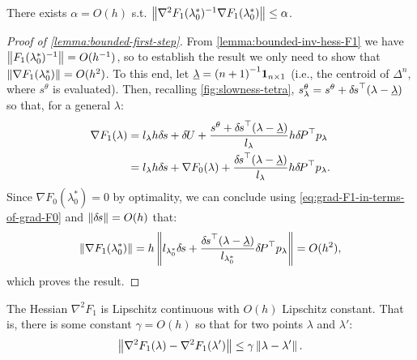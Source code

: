 \documentclass{article}
\begin{document}
\begin{lemma}\label{lemma:bounded-first-step}
  There exists $\alpha = O(h)$ s.t.
  $\left\|\nabla^2 F_1(\lambda_{0}^*)^{-1} \nabla F_1(\lambda_{0}^*)\right\|
  \leq \alpha$.
\end{lemma}

\begin{proof}[Proof of \cref{lemma:bounded-first-step}]
  From \cref{lemma:bounded-inv-hess-F1} we have
  $\left\|F_1(\lambda_0^*)^{-1}\right\| = O(h^{-1})$, so to establish the
  result we only need to show that
  $\left\|\nabla F_1(\lambda_0^*)\right\| = O(h^2)$. To this end, let
  $\underline{\lambda} = {(n + 1)}^{-1} \boldsymbol{1}_{n \times 1}$ (i.e., the
  centroid of $\Delta^n$, where $s^\theta$ is evaluated). Then,
  recalling \cref{fig:slowness-tetra},
  $s^\theta_\lambda = s^\theta + {\delta \hspace{-0.1em} s}^\top (\lambda -
  \underline{\lambda})$ so that, for a general $\lambda$:
  \begin{equation}\label{eq:grad-F1-in-terms-of-grad-F0}
    \begin{aligned}
      \nabla F_1(\lambda) &= l_\lambda h {\delta \hspace{-0.1em} s} + {\delta \hspace{-0.09em} U} + \frac{s^\theta + {\delta \hspace{-0.1em} s}^\top (\lambda - \underline{\lambda})}{l_\lambda} h {\delta \hspace{-0.14em} P}^\top p_\lambda \\
      &= l_\lambda h {\delta \hspace{-0.1em} s} + \nabla F_0(\lambda) + \frac{{\delta \hspace{-0.1em} s}^\top {(\lambda - \underline{\lambda})}}{l_\lambda} h {\delta \hspace{-0.14em} P}^\top p_\lambda.
    \end{aligned}
  \end{equation}
  Since $\nabla F_0(\lambda_0^*) = 0$ by optimality, we can conclude
  using \cref{eq:grad-F1-in-terms-of-grad-F0} and
  $\left\|{\delta \hspace{-0.1em} s}\right\| = O(h)$ that:
  \begin{equation}
    \left\|\nabla F_1(\lambda_0^*)\right\| = h \left\|l_{\lambda_0^*} {\delta \hspace{-0.1em} s} + \frac{{\delta \hspace{-0.1em} s}^\top {(\lambda - \underline{\lambda})}}{l_{\lambda_0^*}} {\delta \hspace{-0.14em} P}^\top p_\lambda\right\| = O(h^2),
  \end{equation}
  which proves the result.
\end{proof}

\begin{lemma}\label{lemma:hess-F1-lipschitz}
  The Hessian $\nabla^2 F_1$ is Lipschitz continuous with $O(h)$
  Lipschitz constant. That is, there is some constant $\gamma = O(h)$
  so that for two points $\lambda$ and $\lambda'$:
  \begin{align*}
    \left\|\nabla^2 F_1(\lambda) - \nabla^2 F_1(\lambda')\right\| \leq \gamma \left\|\lambda - \lambda'\right\|.
  \end{align*}
\end{lemma}
\end{document}
